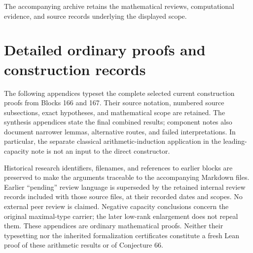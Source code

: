 \documentclass[11pt]{amsart}
\theoremstyle{definition}
\theoremstyle{remark}
\begin{document}
The accompanying archive retains the mathematical reviews, computational evidence, and source records underlying the displayed scope.

\clearpage
\appendix
\section*{Detailed ordinary proofs and construction records}
{}

The following appendices typeset the complete selected current construction
proofs from Blocks 166 and 167. Their source notation, numbered source
subsections, exact hypotheses, and mathematical scope are retained.
The synthesis appendices state the final combined results; component notes
also document narrower lemmas, alternative routes, and failed interpretations.
In particular, the separate classical arithmetic-induction application in
the leading-capacity note is not an input to the direct constructor.

Historical research identifiers, filenames, and references to earlier
blocks are preserved to make the arguments traceable to the accompanying
Markdown files. Earlier ``pending'' review language is superseded by the
retained internal review records included with those source files, at their
recorded dates and scopes. No external peer review is claimed.
Negative capacity conclusions concern the original maximal-type carrier;
the later low-rank enlargement does not repeal them.
These appendices are ordinary mathematical proofs. Neither their typesetting
nor the inherited formalization certificates constitute a fresh Lean proof
of these arithmetic results or of Conjecture 66.

















\clearpage


\end{document}
